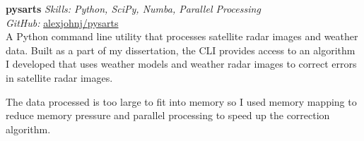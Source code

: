 \textbf{pysarts}  \newline
\textit{Skills: Python, SciPy, Numba, Parallel Processing}\\
\textit{GitHub:} \href{https://github.com/\myweb/pysarts}{alexjohnj/pysarts}\\
A Python command line utility that processes satellite radar images and weather
data. Built as a part of my dissertation, the CLI provides access to an
algorithm I developed that uses weather models and weather radar images to
correct errors in satellite radar images.

The data processed is too large to fit into memory so I used memory mapping to
reduce memory pressure and parallel processing to speed up the correction
algorithm.

